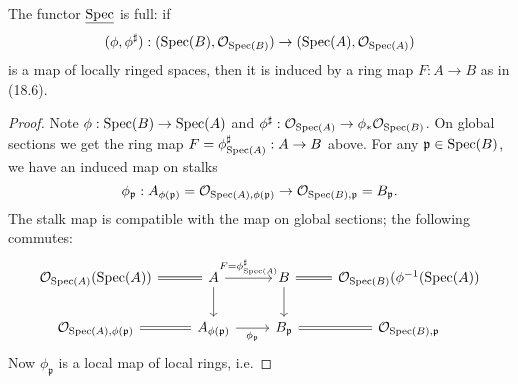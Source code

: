 \documentclass[12pt]{article}
\begin{document}
\begin{proposition}
	The functor $\underline{\text{Spec}}$ is full: if 
	\begin{equation*}
		(\phi,\phi^\sharp): (\text{Spec}(B), \mathcal{O}_{\text{Spec}(B)})\to (\text{Spec}(A), \mathcal{O}_{\text{Spec}(A)})
	\end{equation*}
	is a map of locally ringed spaces, then it is induced by a ring map $F:A\to B$ as in (18.6).
\end{proposition}
\begin{proof}
	Note $\phi:\text{Spec}(B)\to\text{Spec}(A)$ and $\phi^\sharp:\mathcal{O}_{\text{Spec}(A)}\to\phi_\ast\mathcal{O}_{\text{Spec}(B)}$. On global sections we get the ring map $F=\phi^\sharp_{\text{Spec}(A)}:A\to B$ above. For any $\mathfrak{p}\in\text{Spec}(B)$, we have an induced map on stalks 
	\begin{equation*}
		\phi_\mathfrak{p}: A_{\phi(\mathfrak{p})}=\mathcal{O}_{\text{Spec}(A),\phi(\mathfrak{p})}\to\mathcal{O}_{\text{Spec}(B),\mathfrak{p}}=B_\mathfrak{p}.
	\end{equation*}
	The stalk map is compatible with the map on global sections; the following commutes:
	\begin{equation*}
\begin{tikzcd}
\mathcal{O}_{\text{Spec}(A)}(\text{Spec}(A)) \arrow[r, Rightarrow, no head]      & A \arrow[d] \arrow[r, "F=\phi^\sharp_{\text{Spec}(A)}"] & B \arrow[d] \arrow[r, Rightarrow, no head]    & \mathcal{O}_{\text{Spec}(B)}(\phi^{-1}(\text{Spec}(A)) \\
{\mathcal{O}_{\text{Spec}(A),\phi(\mathfrak{p})}} \arrow[r, Rightarrow, no head] & A_{\phi(\mathfrak{p})} \arrow[r, "\phi_\mathfrak{p}"']  & B_\mathfrak{p} \arrow[r, Rightarrow, no head] & {\mathcal{O}_{\text{Spec}(B),\mathfrak{p}}}           
\end{tikzcd}
	\end{equation*}
	Now $\phi_\mathfrak{p}$ is a local map of local rings, i.e. 

\end{proof}
\end{document}
